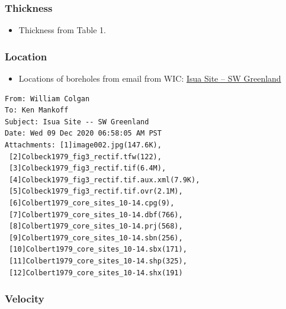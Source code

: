\documentclass[article,a4paper,times,11pt,twoside]{article}
\begin{document}
\subsubsection{Thickness}
\label{sec:org09e908d}

\begin{itemize}
\item Thickness from \textcite{colbeck_1979} Table 1.
\end{itemize}

\subsubsection{Location}
\label{sec:org9f5ff92}

\begin{itemize}
\item Locations of boreholes from email from WIC: \href{msgid:AM0PR04MB6129F131ECD9123E72752945A2CC0@AM0PR04MB6129.eurprd04.prod.outlook.com}{Isua Site -- SW Greenland}
\end{itemize}

\begin{verbatim}
From: William Colgan
To: Ken Mankoff
Subject: Isua Site -- SW Greenland
Date: Wed 09 Dec 2020 06:58:05 AM PST
Attachments: [1]image002.jpg(147.6K),
 [2]Colbeck1979_fig3_rectif.tfw(122),
 [3]Colbeck1979_fig3_rectif.tif(6.4M),
 [4]Colbeck1979_fig3_rectif.tif.aux.xml(7.9K),
 [5]Colbeck1979_fig3_rectif.tif.ovr(2.1M),
 [6]Colbert1979_core_sites_10-14.cpg(9),
 [7]Colbert1979_core_sites_10-14.dbf(766),
 [8]Colbert1979_core_sites_10-14.prj(568),
 [9]Colbert1979_core_sites_10-14.sbn(256),
 [10]Colbert1979_core_sites_10-14.sbx(171),
 [11]Colbert1979_core_sites_10-14.shp(325),
 [12]Colbert1979_core_sites_10-14.shx(191)
\end{verbatim}

\subsubsection{Velocity}
\label{sec:org560f968}
\clearpage
\end{document}

